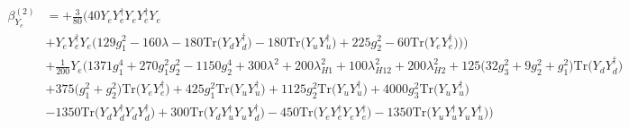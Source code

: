{\begin{align}
\beta_{Y_e}^{(2)} & =  
+\frac{3}{80} \Big(40 {Y_e  Y_{e}^{\dagger}  Y_e  Y_{e}^{\dagger}  Y_e} \nonumber \\ 
 &+{Y_e  Y_{e}^{\dagger}  Y_e} \Big(129 g_{1}^{2}  -160 \lambda  -180 \mbox{Tr}\Big({Y_d  Y_{d}^{\dagger}}\Big)  -180 \mbox{Tr}\Big({Y_u  Y_{u}^{\dagger}}\Big)  + 225 g_{2}^{2}  -60 \mbox{Tr}\Big({Y_e  Y_{e}^{\dagger}}\Big) \Big)\Big)\nonumber \\ 
 &+\frac{1}{200} Y_e \Big(1371 g_{1}^{4} +270 g_{1}^{2} g_{2}^{2} -1150 g_{2}^{4} +300 \lambda^{2} +200 \lambda_{H1}^{2} +100 \lambda_{H12}^{2} +200 \lambda_{H2}^{2} +125 \Big(32 g_{3}^{2}  + 9 g_{2}^{2}  + g_{1}^{2}\Big)\mbox{Tr}\Big({Y_d  Y_{d}^{\dagger}}\Big) \nonumber \\ 
 &+375 \Big(g_{1}^{2} + g_{2}^{2}\Big)\mbox{Tr}\Big({Y_e  Y_{e}^{\dagger}}\Big) +425 g_{1}^{2} \mbox{Tr}\Big({Y_u  Y_{u}^{\dagger}}\Big) +1125 g_{2}^{2} \mbox{Tr}\Big({Y_u  Y_{u}^{\dagger}}\Big) +4000 g_{3}^{2} \mbox{Tr}\Big({Y_u  Y_{u}^{\dagger}}\Big) \nonumber \\ 
 &-1350 \mbox{Tr}\Big({Y_d  Y_{d}^{\dagger}  Y_d  Y_{d}^{\dagger}}\Big) +300 \mbox{Tr}\Big({Y_d  Y_{u}^{\dagger}  Y_u  Y_{d}^{\dagger}}\Big) -450 \mbox{Tr}\Big({Y_e  Y_{e}^{\dagger}  Y_e  Y_{e}^{\dagger}}\Big) -1350 \mbox{Tr}\Big({Y_u  Y_{u}^{\dagger}  Y_u  Y_{u}^{\dagger}}\Big) \Big)
\end{align}} 
